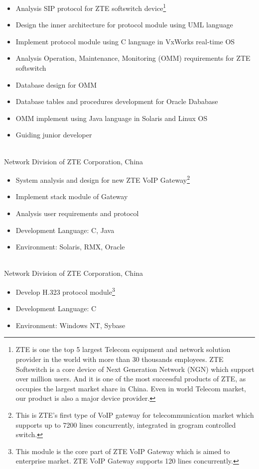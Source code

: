 \documentclass[margin,12pt]{res}
\begin{document}
\begin{resume}
    \begin{itemize} \itemsep -2pt %
    \item Analysis SIP protocol for ZTE softswitch device\footnote{ZTE is
        one the top 5 largest Telecom equipment and network solution provider in the world
        with more than 30 thousands employees. ZTE Softswitch is a core device of Next
        Generation Network (NGN) which support over million users. And it is one of the
        most successful products of ZTE, as occupies the largest market share in China.
        Even in world Telecom market, our product is also a major device provider.}
    \item Design the inner architecture for protocol module using UML language
    \item Implement protocol module using C language in VxWorks real-time OS
    \item Analysis Operation, Maintenance, Monitoring (OMM) requirements for ZTE softswitch
    \item Database design for OMM
    \item Database tables and procedures development for Oracle Dababase
    \item OMM implement using Java language in Solaris and Linux OS
    \item Guiding junior developer
    \end{itemize}
 
     \\
    Network Division of ZTE Corporation, China
     \begin{itemize}  \itemsep -2pt %
     \item System analysis and design for new ZTE VoIP Gateway\footnote{This is ZTE's first type of
         VoIP gateway for telecommunication market which supports up to 7200 lines concurrently,
         integrated in grogram controlled switch. }
     \item Implement stack module of Gateway
     \item Analysis user requirements and protocol
     \item Development Language: C, Java
     \item Environment: Solaris, RMX, Oracle
     \end{itemize} 

     \\
    Network Division of ZTE Corporation, China
      \begin{itemize}
       \item Develop H.323 protocol module\footnote{This module
           is the core part of ZTE VoIP Gateway which is aimed to enterprise market. ZTE
           VoIP Gateway supports 120 lines concurrently.}
       \item Development Language: C
       \item Environment: Windows NT, Sybase
       \end{itemize} 


\end{resume}
\end{document}
